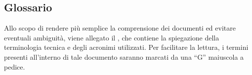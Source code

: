 \subsection{Glossario}
	Allo scopo di rendere più semplice la comprensione dei documenti ed evitare eventuali ambiguità, viene allegato il , che contiene la spiegazione della terminologia tecnica e degli acronimi utilizzati. Per facilitare la lettura, i termini presenti all'interno di tale documento saranno marcati da una “G” maiuscola a pedice.